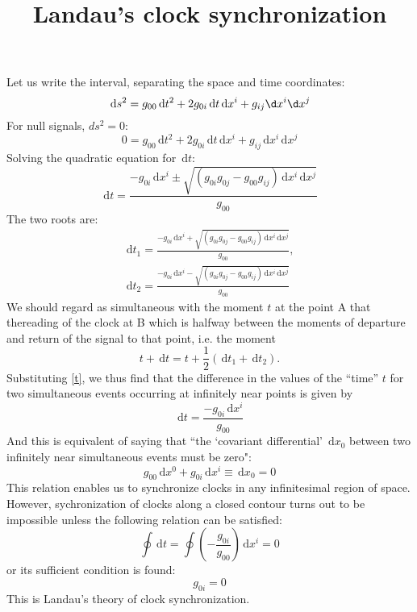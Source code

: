 \documentclass{article}
\title{Landau's clock synchronization}
\newcommand{\be}{\begin{equation}}
\newcommand{\ee}{\end{equation}}
\newcommand{\dif}{\,\mathrm{d}}
\begin{document}
\maketitle
Let us write the interval, separating the space and time coordinates:
\be
\dif s^2=g_{00}\dif t^2+2g_{0i}\dif t\dif x^i+g_{ij}\d x^i\d x^j
\ee
For null signals, $ds^2=0$:
\be
0=g_{00}\dif t^2+2g_{0i}\dif t\dif x^i+g_{ij}\dif x^i\dif x^j
\ee
Solving the quadratic equation for $\dif t$:
\be
\dif t=\frac{-g_{0i}\dif x^i\pm\sqrt{(g_{0i}g_{0j}-g_{00}g_{ij})\dif x^i\dif x^j}}{g_{00}}
\ee
The two roots are:
\be
\label{t} 
\begin{split}
\dif t_1=\frac{-g_{0i}\dif x^i+\sqrt{(g_{0i}g_{0j}-g_{00}g_{ij})\dif x^i\dif x^j}}{g_{00}},\\
\dif t_2=\frac{-g_{0i}\dif x^i-\sqrt{(g_{0i}g_{0j}-g_{00}g_{ij})\dif x^i\dif x^j}}{g_{00}}
\end{split}
\ee
We should regard as simultaneous with the moment $t$ at the point A that thereading of the clock at B which is halfway between the moments of departure and return of the signal to that point, i.e. the moment
\be 
t+\dif t=t+\frac{1}{2}(\dif t_1+\dif t_2).
\ee
Substituting \eqref{t}, we thus find that the difference in the values of the ``time'' $t$ for two simultaneous events occurring at infinitely near points is given by
\be 
\dif t=\frac{-g_{0i}\dif x^i}{g_{00}}
\ee
And this is equivalent of saying that ``the `covariant differential' $\dif x_0$ between two infinitely near simultaneous events must be zero":
\be 
g_{00}\dif x^0+g_{0i}\dif x^i\equiv\dif x_0=0
\ee
This relation enables us to synchronize clocks in any infinitesimal region of space.\\

However, sychronization of clocks along a closed contour turns out to be impossible unless the following relation can be satisfied:
\be 
\oint \dif t=\oint \left(-\frac{g_{0i}}{g_{00}}\right) \dif x^i=0
\ee
or its sufficient condition is found:
\be 
g_{0i}=0
\ee
This is Landau's theory of clock synchronization.
\end{document}
